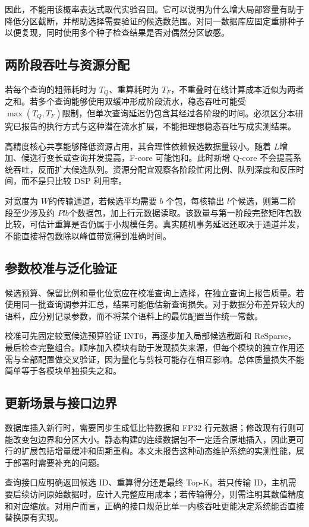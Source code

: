 因此，不能用该概率表达式取代实验召回。它可以说明为什么增大局部容量有助于降低分区截断，并帮助选择需要验证的候选数范围。对同一数据库应固定重排种子以便复现，同时使用多个种子检查结果是否对偶然分区敏感。

\subsection{两阶段吞吐与资源分配}
若每个查询的粗筛耗时为 $T_Q$、重算耗时为 $T_F$，不重叠时在线计算成本近似为两者之和。若多个查询能够使用双缓冲形成阶段流水，稳态吞吐可能受 $\max(T_Q,T_F)$限制，但单次查询延迟仍包含其经过各阶段的时间。必须区分本研究已报告的执行方式与这种潜在流水扩展，不能把理想稳态吞吐写成实测结果。

高精度核心共享能够降低资源占用，其合理性依赖候选数据量较小。随着 $L$增加、候选行变长或查询并发提高，F-core 可能饱和。此时新增 Q-core 不会提高系统吞吐，反而扩大候选队列。资源分配宜观察各阶段忙闲比例、队列深度和反压时间，而不是只比较 DSP 利用率。

对宽度为 $W$的传输通道，若候选平均需要 $b$ 个包，每核输出 $l$个候选，则第二阶段至少涉及约 $Plb$个数据包，加上行元数据读取。该数量与第一阶段完整矩阵包数比较，可估计重算是否仍属于小规模任务。真实随机事务延迟还取决于通道并发，不能直接将包数除以峰值带宽得到准确时间。

\subsection{参数校准与泛化验证}
候选预算、保留比例和量化位宽应在校准查询上选择，在独立查询上报告质量。若使用同一批查询调参并汇总，结果可能低估新查询损失。对于数据分布差异较大的语料，应分别记录参数，而不将某个语料上的最优配置当作统一常数。

校准可先固定较宽候选预算验证 INT6，再逐步加入局部候选截断和 ReSparse，最后检查完整组合。顺序加入模块有助于发现损失来源，但每个模块的独立作用还需与全部配置做交叉验证，因为量化与剪枝可能存在相互影响。总体质量损失不能简单等于各模块单独损失之和。

\subsection{更新场景与接口边界}
数据库插入新行时，需要同步生成低比特数据和 FP32 行元数据；修改现有行则可能改变包边界和分区大小。静态构建的连续数据包不一定适合原地插入，因此更可行的扩展包括增量缓冲和周期重构。本文未报告这种动态维护系统的实测性能，属于部署时需要补充的问题。

查询接口应明确返回候选 ID、重算得分还是最终 Top-K。若只传输 ID，主机需要后续访问原始数据时，应计入完整应用成本；若传输得分，则需注明其数值精度和对应缩放。对用户而言，正确的接口规范比单一内核吞吐更能决定系统能否直接替换原有实现。
